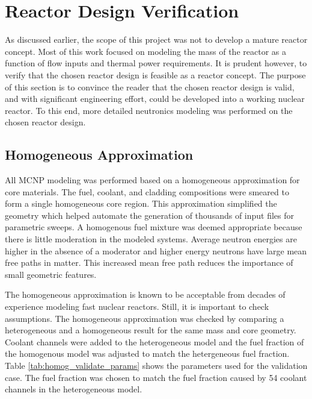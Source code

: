 \chapter{Reactor Design Verification}
    As discussed earlier, the scope of this project was not to develop a mature
reactor concept. Most of this work focused on modeling the mass of the
reactor as a function of flow inputs and thermal power requirements. It is
prudent however, to verify that the chosen reactor design is feasible as a
reactor concept. The purpose of this section is to convince the reader that
the chosen reactor design is valid, and with significant engineering effort,
could be developed into a working nuclear reactor. To this end, more detailed
neutronics modeling was performed on the chosen reactor design.

\section{Homogeneous Approximation}
All MCNP modeling was performed based on a homogeneous approximation for core
materials. The fuel, coolant, and cladding compositions were smeared to form a
single homogeneous core region. This approximation simplified the geometry which
helped automate the generation of thousands of input files for parametric
sweeps. A homogenous fuel mixture was deemed appropriate because there is little
moderation in the modeled systems. Average neutron energies are higher in the
absence of a moderator and higher energy neutrons have large mean free paths in
matter. This increased mean free path reduces the importance of small geometric
features.

The homogeneous approximation is known to be acceptable from decades of
experience modeling fast nuclear reactors. Still, it is important to check
assumptions. The homogeneous approximation was checked by comparing a
heterogeneous and a homogeneous \keff result for the same \uran mass and core
geometry. Coolant channels were added to the heterogeneous model and the fuel
fraction of the homogenous model was adjusted to match the hetergeneous fuel
fraction. Table \ref{tab:homog_validate_params} shows the parameters used for
the validation case. The fuel fraction was chosen to match the fuel fraction
caused by 54 coolant channels in the heterogeneous model.

